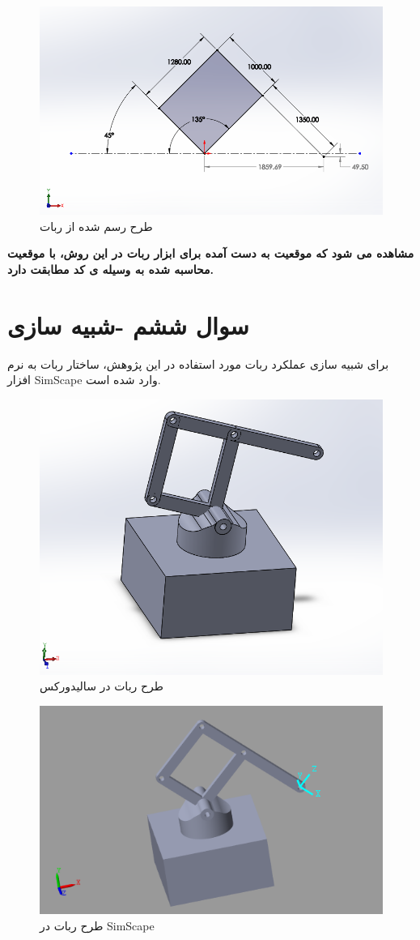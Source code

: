 \documentclass{article}
\begin{document}
\begin{figure}[H]
    \centering
    \includegraphics[width=1\linewidth]{solid_sketch.PNG}
    \caption{طرح رسم شده از ربات}
    \label{fig:Robot_cad}
\end{figure}

\textbf{
مشاهده می شود که موقعیت به دست آمده برای ابزار ربات در این روش، با موقعیت محاسبه شده به وسیله ی کد مطابقت دارد.}

\section{سوال ششم -شبیه سازی}\label{Section6}
برای شبیه سازی عملکرد ربات مورد استفاده در این پژوهش، ساختار ربات به نرم افزار SimScape وارد شده است.

\begin{figure}[H]
    \centering
    \includegraphics[width=0.5\linewidth]{robot_solid.PNG}
    \caption{طرح ربات در سالیدورکس}
    \label{fig:enter-label}
\end{figure}

\begin{figure}[H]
    \centering
    \includegraphics[width=0.5\linewidth]{robot_simscape.PNG}
    \caption{طرح ربات در SimScape}
    \label{fig:enter-label}
\end{figure}
\end{document}
